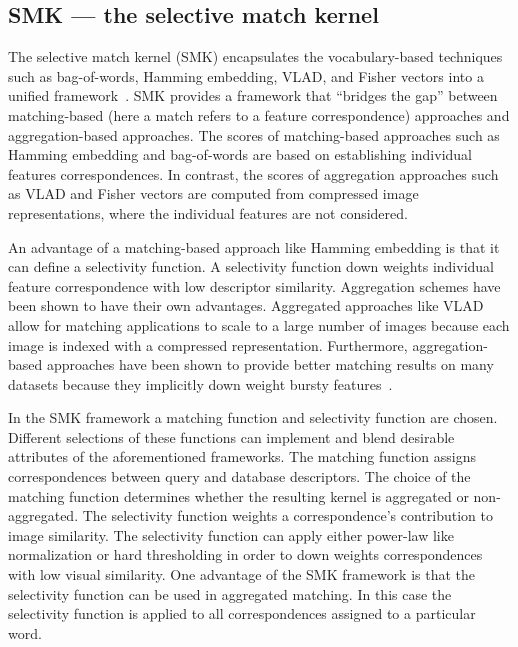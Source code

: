     \subsection{SMK --- the selective match kernel}\label{sec:smk}
        The selective match kernel (SMK) encapsulates the vocabulary-based techniques such as bag-of-words, Hamming
        embedding, VLAD, and Fisher vectors into a unified framework~\cite{bo_efficient_2009,
        tolias_aggregate_2013, tolias_image_2015, jegou_triangulation_2014}. SMK provides a framework that
        ``bridges the gap'' between matching-based (here a match refers to a feature correspondence) approaches and
        aggregation-based approaches. The scores of matching-based approaches such as Hamming embedding and
        bag-of-words are based on establishing individual features correspondences. In contrast, the scores of
        aggregation approaches such as VLAD and Fisher vectors are computed from compressed image representations,
        where the individual features are not considered.

        An advantage of a matching-based approach like Hamming embedding is that it can define a selectivity
        function. A selectivity function down weights individual feature correspondence with low descriptor
        similarity. Aggregation schemes have been shown to have their own advantages. Aggregated approaches like
        VLAD allow for matching applications to scale to a large number of images because each image is indexed
        with a compressed representation. Furthermore, aggregation-based approaches have been shown to provide
        better matching results on many datasets because they implicitly down weight bursty
        features~\cite{tolias_aggregate_2013, tolias_image_2015}.

        In the SMK framework a matching function and selectivity function are chosen. Different selections of these
        functions can implement and blend desirable attributes of the aforementioned frameworks. The matching
        function assigns correspondences between query and database descriptors. The choice of the matching
        function determines whether the resulting kernel is aggregated or non-aggregated. The selectivity function
        weights a correspondence's contribution to image similarity. The selectivity function can apply either
        power-law like normalization or hard thresholding in order to down weights correspondences with low visual
        similarity. One advantage of the SMK framework is that the selectivity function can be used in aggregated
        matching. In this case the selectivity function is applied to all correspondences assigned to a particular
        word.

